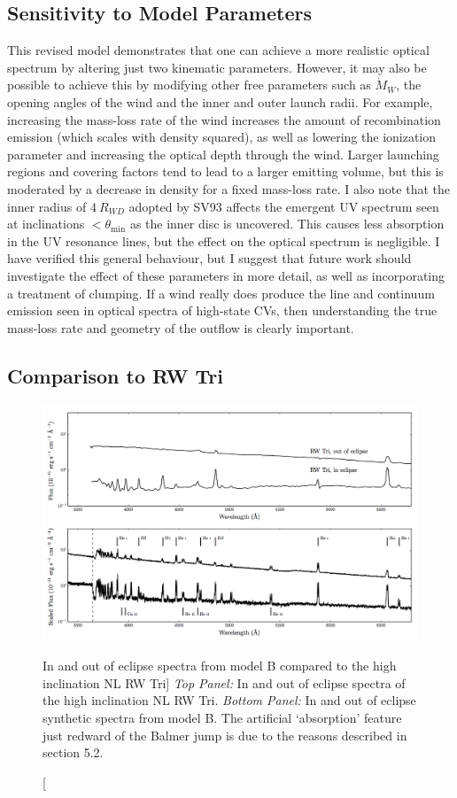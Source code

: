 \subsection{Sensitivity to Model Parameters}
\label{sec:cv_params}
This revised model demonstrates that one can achieve a more
realistic optical spectrum by altering just two kinematic parameters. 
However, it may also be possible to achieve this by modifying
other free parameters such as $\dot{M}_{W}$, the opening angles of the wind and the 
inner and outer launch radii. For example, increasing the mass-loss rate of the wind
increases the amount of recombination emission (which scales with density squared), 
as well as lowering the ionization parameter and increasing the optical depth through the wind. 
Larger launching regions and covering factors tend to lead to a larger emitting volume, 
but this is moderated by a decrease in density 
for a fixed mass-loss rate. I also note that the inner radius of $4~R_{WD}$ adopted by SV93 
affects the emergent UV spectrum seen at inclinations $<\theta_{\mathrm{min}}$ as 
the inner disc is uncovered. This causes less absorption in the UV resonance lines,
but the effect on the optical spectrum is negligible.
I have verified this general behaviour, but
I suggest that future work should investigate the effect of these parameters in more detail,
as well as incorporating a treatment of clumping.
If a wind really does produce the line and continuum emission seen in optical spectra of high-state CVs, then
understanding the true mass-loss rate and geometry of the outflow is clearly important.


\subsection{Comparison to RW Tri}
\label{sec:rwtri}
\begin{figure}
\includegraphics[width=0.9\textheight, angle=270]{figures/05-cvpaper/fig13.png}
\caption
[In and out of eclipse spectra from model B compared to the high
inclination NL RW Tri]
{{\sl Top Panel:} In and out of eclipse spectra of the high
inclination NL RW Tri. {\sl Bottom Panel:} In and out of eclipse synthetic
spectra from model B.
The artificial `absorption' feature just redward of the Balmer jump
is due to the reasons described in section 5.2.}
\label{rwtricomp}
\end{figure}

